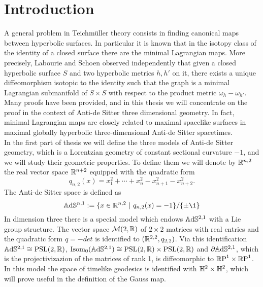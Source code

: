 \chapter*{Introduction}
\noindent A general problem in Teichm\"uller theory consists in finding canonical maps between hyperbolic surfaces. In particular it is known that in the isotopy class of the identity of a closed surface there are the minimal Lagrangian maps. More precisely, Labourie and Schoen observed independently that given a closed hyperbolic surface $S$ and two hyperbolic metrics $h, h'$ on it, there exists a unique diffeomorphism isotopic to the identity such that the graph is a minimal Lagrangian submanifold of $S \times S$ with respect to the product metric $\omega_h - \omega_{h'}$.
Many proofs have been provided, and in this thesis we will concentrate on the proof in the context of Anti-de Sitter three dimensional geometry. In fact, minimal Lagrangian maps are closely related to maximal spacelike surfaces in maximal globally hyperbolic three-dimensional Anti-de Sitter spacetimes. \\

In the first part of thesis we will define the three models of Anti-de Sitter geometry, which is a Lorentzian geometry of constant sectional curvature $-1$, and we will study their geometric properties. To define them we will denote by $\mathbb{R} ^{n,2}$ the real vector space $\mathbb{R} ^{n+2}$ equipped with the quadratic form
\[
q_{n,2}(x) = x_1^2 + \cdots + x_n^2 - x_{n+1}^2 - x_{n+2}^2.
\]
The Anti-de Sitter space is defined as
\[
\A^{n,1} := \{ x\in \R^{n,2} \ | \ q_{n,2}(x) = -1 \} / \{ \pm \1 \}
\]
In dimension three there is a special model which endows $\mathbb{A}\mathrm{d}\mathbb{S}^{2,1}$ with a Lie group structure.
The vector space $\mathcal{M}(2,\mathbb{R})$ of $2 \times 2$ matrices with real entries and the quadratic form $q= -det$ is identified to $(\mathbb{R}^{2,2},q_{2,2})$. Via this identification $\mathbb{A}\mathrm{d}\mathbb{S}^{2,1} \cong \text{PSL}(2,\mathbb{R})$, $\text{Isom}_0(\mathbb{A}\mathrm{d}\mathbb{S}^{2,1}) \cong \text{PSL}(2,\mathbb{R}) \times \text{PSL}(2,\mathbb{R})$ and $\partial\mathbb{A}\mathrm{d}\mathbb{S}^{2,1}$, which is the projectivizazion of the matrices of rank 1, is diffeomorphic to $\mathbb{R}\textup{P}^1\times\mathbb{R}\textup{P}^1$. In this model the space of timelike geodesics is identified with $\mathbb{H}^2 \times \mathbb{H}^2$, which will prove useful in the definition of the Gauss map.\\

